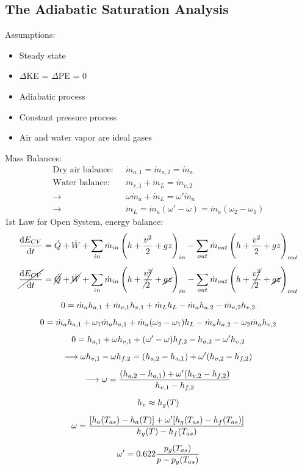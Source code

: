 \subsection{The Adiabatic Saturation Analysis}
Assumptions:
\begin{itemize}[noitemsep]
  \item Steady state
  \item $\Delta$KE = $\Delta$PE = 0
  \item Adiabatic process
  \item Constant pressure process
  \item Air and water vapor are ideal gases
\end{itemize}
Mass Balances:
\begin{align}
  \text{Dry air balance:} \ \ \  & \dot{m}_{a,1} = \dot{m}_{a,2} = \dot{m}_a                            \\[5pt]
  \text{Water balance:} \ \ \    & \dot{m}_{v,1} + \dot{m}_L = \dot{m}_{v,2}                            \\[5pt]
  \longrightarrow \ \ \          & \omega\dot{m}_a + \dot{m}_L = \omega'\dot{m}_a                       \\[5pt]
  \longrightarrow \ \ \          & \dot{m}_L = \dot{m}_a(\omega'-\omega) = \dot{m}_a(\omega_2-\omega_1)
\end{align}
1st Law for Open System, energy balance:
\begin{gather}
  \frac{\dif E_{CV}}{\dif t} = \dot{Q} + \dot{W} + \sum_{in}\dot{m}_{in}\left(h+\frac{v^2}{2}+gz\right)_{in} - \sum_{out}\dot{m}_{out}\left(h+\frac{v^2}{2}+gz\right)_{out} \\[5pt]
  \cancel{\frac{\dif E_{CV}}{\dif t}} = \cancel{\dot{Q}} + \cancel{\dot{W}} + \sum_{in}\dot{m}_{in}\left(h+\cancel{\frac{v^2}{2}}+\cancel{gz}\right)_{in} - \sum_{out}\dot{m}_{out}\left(h+\cancel{\frac{v^2}{2}}+\cancel{gz}\right)_{out} \\[5pt]
  0 = \dot{m}_{a}h_{a,1} + \dot{m}_{v,1}h_{v,1} + \dot{m}_{L}h_{L} - \dot{m}_{a}h_{a,2} - \dot{m}_{v,2}h_{v,2} \\[5pt]
  0 = \dot{m}_{a}h_{a,1} + \omega_{1}\dot{m}_{a}h_{v,1} + \dot{m}_{a}(\omega_2 - \omega_1)h_{L} - \dot{m}_{a}h_{a,2} - \omega_2\dot{m}_{a}h_{v,2} \\[5pt]
  0 = h_{a,1} + \omega h_{v,1} + (\omega'-\omega)h_{f,2} - h_{a,2} - \omega'h_{v,2} \\[5pt]
  \longrightarrow \omega h_{v,1} - \omega h_{f,2} = (h_{a,2} - h_{a,1}) + \omega'(h_{v,2} - h_{f,2}) \\[5pt]
  \longrightarrow \omega = \frac{(h_{a,2} - h_{a,1}) + \omega'(h_{v,2} - h_{f,2})}{h_{v,1} - h_{f,2}} \\[5pt]
  h_v \approx h_g(T) \\[5pt]
  \omega = \frac{[h_a(T_{as}) - h_a(T)] + \omega'[h_g(T_{as}) - h_f(T_{as})]}{h_g(T) - h_f(T_{as})} \\[5pt]
  \omega' = 0.622\frac{p_g(T_{as})}{p - p_g(T_{as})}
\end{gather}
